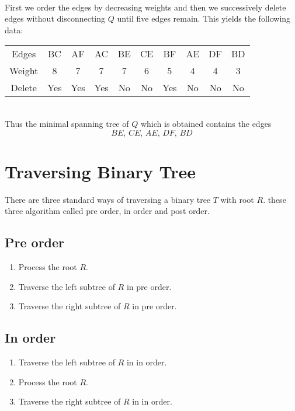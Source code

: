 \documentclass[12pt,oneside,a4paper]{book}
\theoremstyle{remark}
\theoremstyle{definition}
\begin{document}
\\
First we order the edges by decreasing weights and then we successively delete edges without disconnecting $ Q $ until five edges remain. This yields the following data:\\
\begin{tabular}{c c c c c c c c c c}
    Edges & BC & AF & AC & BE & CE & BF & AE & DF & BD \\
    Weight & 8 & 7 & 7 & 7 & 6 & 5 & 4 & 4 & 3\\
    Delete & Yes & Yes & Yes & No  & No & Yes & No & No & No\\
\end{tabular}\\
Thus the minimal spanning tree of $ Q $ which is obtained contains the edges \[BE,\,CE,\,AE,\,DF,\,BD\]
\section{Traversing Binary Tree}
There are three standard ways of traversing a binary tree $ T $ with root $ R $. these three algorithm called pre order, in order and post order.
\subsection{Pre order}
\begin{enumerate}
    \item Process the root $ R $.
    \item Traverse the left subtree of $ R $ in pre order.
    \item Traverse the right subtree of $ R $ in pre order.
\end{enumerate}
\subsection{In order}
\begin{enumerate}
    \item Traverse the left subtree of $ R $ in in order.
    \item Process the root $ R $.
    \item Traverse the right subtree of $ R $ in in order.
\end{enumerate}
\end{document}

